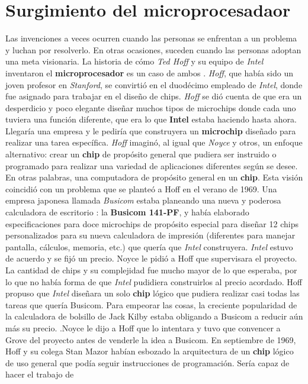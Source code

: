 \section{Surgimiento del microprocesadaor}
Las invenciones a veces ocurren cuando las personas se enfrentan a un problema y luchan por resolverlo. En otras ocasiones, suceden 
cuando las personas adoptan una meta visionaria. La historia de cómo \emph{Ted Hoff} y su equipo de \emph{Intel} inventaron el \textbf
{microprocesador} es un caso de ambos . \emph{Hoff}, que había sido un joven profesor en \emph{Stanford}, se
convirtió en el duodécimo empleado de \emph{Intel}, donde fue asignado para trabajar en el diseño de chips. \emph{Hoff} se dió cuenta de que era un
desperdicio y poco elegante diseñar muchos tipos de microchips donde cada uno tuviera una función diferente,  que era lo que \textbf
{Intel} estaba haciendo hasta ahora. Llegaría una empresa y le pediría que construyera un \textbf{microchip} diseñado para realizar una tarea
específica. \emph{Hoff} imaginó, al igual que \emph{Noyce} y otros, un enfoque alternativo: crear un \textbf{chip} de propósito general que pudiera
ser instruido o programado para realizar una variedad de aplicaciones diferentes según se desee. En otras palabras, una computadora de propósito
general en un \textbf{chip}. Esta visión coincidió con un problema que se planteó a Hoff en el verano de 1969. Una empresa japonesa llamada \emph
{Busicom} estaba planeando una nueva y poderosa calculadora de escritorio : la \textbf{Busicom 141-PF}, y había elaborado especificaciones para
doce microchips de propósito especial para diseñar 12 chips personalizados para su nueva calculadora de impresión (diferentes para
manejar pantalla, cálculos, memoria, etc.) que quería que \emph{Intel} construyera. \emph{Intel} estuvo de acuerdo y se fijó un precio. Noyce le
pidió a Hoff que supervisara el proyecto. La cantidad de chips y su complejidad fue mucho mayor de lo que esperaba, por lo que no
había forma de que \emph{Intel} pudidiera construirlos al precio acordado. Hoff propuso que \emph{Intel} diseñara un solo \textbf{chip} lógico
que pudiera realizar casi todas las tareas que quería Busicom. Para empeorar las cosas,  la creciente popularidad de la calculadora
de bolsillo de Jack Kilby estaba obligando a Busicom a reducir aún más su precio. .Noyce le dijo a Hoff que lo intentara y  tuvo que
convencer a Grove del proyecto antes de venderle la idea a Busicom. En septiembre de 1969, Hoff y su colega Stan Mazor habían esbozado
la arquitectura de un \textbf{chip} lógico de uso general que podía seguir instrucciones de programación. Sería capaz de hacer el trabajo de
